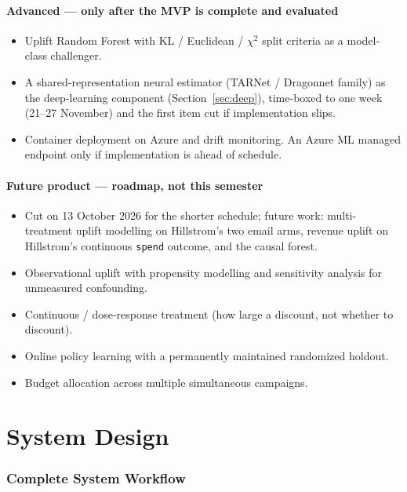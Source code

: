 \documentclass[11pt,a4paper]{article}
\begin{document}
\subsection{Advanced --- only after the MVP is complete and evaluated}

\begin{itemize}
\item Uplift Random Forest with KL / Euclidean / $\chi^2$ split criteria as a model-class challenger.
\item A shared-representation neural estimator (TARNet / Dragonnet family) as the deep-learning
component (Section~\ref{sec:deep}), time-boxed to one week (21--27 November) and the first item
cut if implementation slips.
\item Container deployment on Azure and drift monitoring. An Azure ML managed endpoint only if
implementation is ahead of schedule.
\end{itemize}

\subsection{Future product --- roadmap, not this semester}

\begin{itemize}
\item Cut on 13 October 2026 for the shorter schedule; future work: multi-treatment uplift
modelling on Hillstrom's two email arms, revenue uplift on Hillstrom's continuous \texttt{spend}
outcome, and the causal forest.
\item Observational uplift with propensity modelling and sensitivity analysis for unmeasured
confounding.
\item Continuous / dose-response treatment (how large a discount, not whether to discount).
\item Online policy learning with a permanently maintained randomized holdout.
\item Budget allocation across multiple simultaneous campaigns.
\end{itemize}
\part{System Design}

\section{Complete System Workflow}
\end{document}
